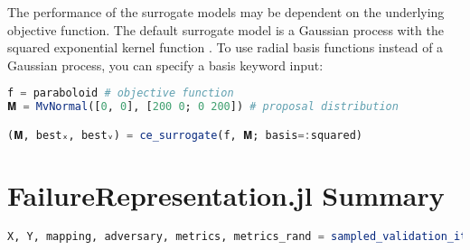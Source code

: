 The performance of the surrogate models may be dependent on the underlying objective function. The default surrogate model is a Gaussian process with the squared exponential kernel function \cite{kochenderfer2019algorithms}. To use radial basis functions instead of a Gaussian process, you can specify a basis keyword input:

\begin{lstlisting}[language=Julia]
f = paraboloid # objective function
𝐌 = MvNormal([0, 0], [200 0; 0 200]) # proposal distribution

(𝐌, bestₓ, bestᵥ) = ce_surrogate(f, 𝐌; basis=:squared)
\end{lstlisting}


\section{FailureRepresentation.jl Summary}

\begin{lstlisting}[language=Julia]
X, Y, mapping, adversary, metrics, metrics_rand = sampled_validation_iteration(T=10)
\end{lstlisting}